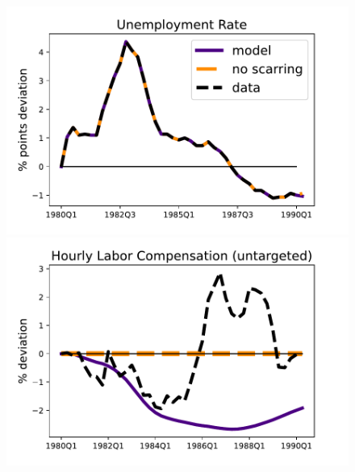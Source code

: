 \begin{figure}[H] %
\centering
\begin{minipage}{0.51\textwidth}
\includegraphics[scale=.57]{text/Chapter1/Figures/80s/Urate_80s}
\end{minipage}\hspace*{\fill}
\begin{minipage}{0.51\textwidth}
\includegraphics[scale=.57]{text/Chapter1/Figures/80s/hourly_comp_80s}
\end{minipage}


\end{figure}
